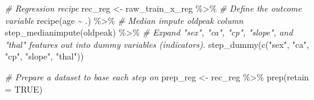 \documentclass[
]{book}
\newenvironment{Shaded}{\begin{snugshade}}{\end{snugshade}}
\newcommand{\AttributeTok}[1]{\textcolor[rgb]{0.77,0.63,0.00}{#1}}
\newcommand{\CommentTok}[1]{\textcolor[rgb]{0.56,0.35,0.01}{\textit{#1}}}
\newcommand{\ConstantTok}[1]{\textcolor[rgb]{0.00,0.00,0.00}{#1}}
\newcommand{\FunctionTok}[1]{\textcolor[rgb]{0.00,0.00,0.00}{#1}}
\newcommand{\NormalTok}[1]{#1}
\newcommand{\OtherTok}[1]{\textcolor[rgb]{0.56,0.35,0.01}{#1}}
\newcommand{\SpecialCharTok}[1]{\textcolor[rgb]{0.00,0.00,0.00}{#1}}
\newcommand{\StringTok}[1]{\textcolor[rgb]{0.31,0.60,0.02}{#1}}
\begin{document}
\begin{Shaded}
\begin{Highlighting}[]
\CommentTok{\# Regression recipe }
\NormalTok{rec\_reg }\OtherTok{\textless{}{-}}\NormalTok{ raw\_train\_x\_reg }\SpecialCharTok{\%\textgreater{}\%}
  \CommentTok{\# Define the outcome variable }
  \FunctionTok{recipe}\NormalTok{(age }\SpecialCharTok{\textasciitilde{}}\NormalTok{ .) }\SpecialCharTok{\%\textgreater{}\%}
  \CommentTok{\# Median impute oldpeak column }
  \FunctionTok{step\_medianimpute}\NormalTok{(oldpeak) }\SpecialCharTok{\%\textgreater{}\%}
  \CommentTok{\# Expand "sex", "ca", "cp", "slope", and "thal" features out into dummy variables (indicators). }
  \FunctionTok{step\_dummy}\NormalTok{(}\FunctionTok{c}\NormalTok{(}\StringTok{"sex"}\NormalTok{, }\StringTok{"ca"}\NormalTok{, }\StringTok{"cp"}\NormalTok{, }\StringTok{"slope"}\NormalTok{, }\StringTok{"thal"}\NormalTok{))}

\CommentTok{\# Prepare a dataset to base each step on}
\NormalTok{prep\_reg }\OtherTok{\textless{}{-}}\NormalTok{ rec\_reg }\SpecialCharTok{\%\textgreater{}\%} \FunctionTok{prep}\NormalTok{(}\AttributeTok{retain =} \ConstantTok{TRUE}\NormalTok{) }
\end{Highlighting}
\end{Shaded}

\begin{Shaded}
\end{Shaded}
\end{document}
